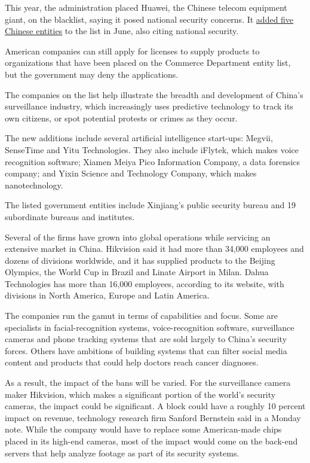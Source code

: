 This year, the administration placed Huawei, the Chinese telecom
equipment giant, on the blacklist, saying it posed national security
concerns. It
\href{https://www.nytimes.com/2019/06/21/us/politics/us-china-trade-blacklist.html}{added
five Chinese entities} to the list in June, also citing national
security.

American companies can still apply for licenses to supply products to
organizations that have been placed on the Commerce Department entity
list, but the government may deny the applications.

The companies on the list help illustrate the breadth and development of
China's surveillance industry, which increasingly uses predictive
technology to track its own citizens, or spot potential protests or
crimes as they occur.

The new additions include several artificial intelligence start-ups:
Megvii, SenseTime and Yitu Technologies. They also include iFlytek,
which makes voice recognition software; Xiamen Meiya Pico Information
Company, a data forensics company; and Yixin Science and Technology
Company, which makes nanotechnology.

The listed government entities include Xinjiang's public security bureau
and 19 subordinate bureaus and institutes.

Several of the firms have grown into global operations while servicing
an extensive market in China. Hikvision said it had more than 34,000
employees and dozens of divisions worldwide, and it has supplied
products to the Beijing Olympics, the World Cup in Brazil and Linate
Airport in Milan. Dahua Technologies has more than 16,000 employees,
according to its website, with divisions in North America, Europe and
Latin America.

The companies run the gamut in terms of capabilities and focus. Some are
specialists in facial-recognition systems, voice-recognition software,
surveillance cameras and phone tracking systems that are sold largely to
China's security forces. Others have ambitions of building systems that
can filter social media content and products that could help doctors
reach cancer diagnoses.

As a result, the impact of the bans will be varied. For the surveillance
camera maker Hikvision, which makes a significant portion of the world's
security cameras, the impact could be significant. A block could have a
roughly 10 percent impact on revenue, technology research firm Sanford
Bernstein said in a Monday note. While the company would have to replace
some American-made chips placed in its high-end cameras, most of the
impact would come on the back-end servers that help analyze footage as
part of its security systems.

